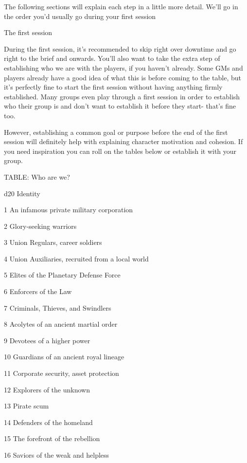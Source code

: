 The following sections will explain each step in a little more detail. We’ll go in the order you’d
usually go during your first session

                                                The first session

During the first session, it’s recommended to skip right over downtime and go right to the brief
and onwards. You’ll also want to take the extra step of establishing who we are with the players,
if you haven’t already. Some GMs and players already have a good idea of what this is before
coming to the table, but it’s perfectly fine to start the first session without having anything firmly
established. Many groups even play through a first session in order to establish who their group
is and don’t want to establish it before they start- that’s fine too.

However, establishing a common goal or purpose before the end of the first session will definitely
help with explaining character motivation and cohesion. If you need inspiration you can roll on
the tables below or establish it with your group.

TABLE: Who are we?

 d20       Identity

 1         An infamous private military corporation

 2         Glory-seeking warriors

 3         Union Regulars, career soldiers

 4         Union Auxiliaries, recruited from a local world

 5         Elites of the Planetary Defense Force

 6         Enforcers of the Law

 7         Criminals, Thieves, and Swindlers

 8         Acolytes of an ancient martial order

 9         Devotees of a higher power

  10       Guardians of an ancient royal lineage

  11       Corporate security, asset protection

  12       Explorers of the unknown

  13       Pirate scum

  14       Defenders of the homeland

  15       The forefront of the rebellion

  16       Saviors of the weak and helpless

